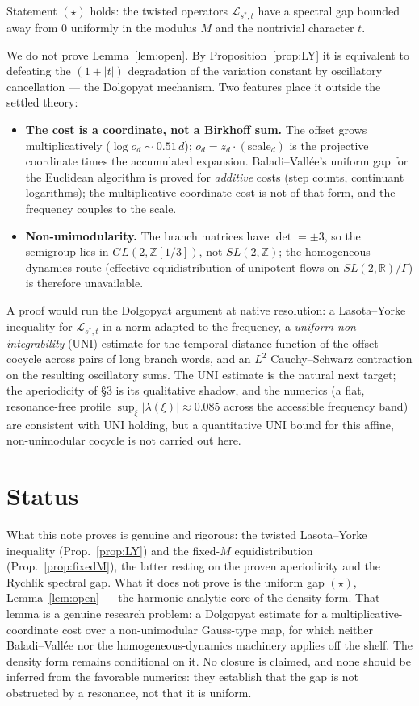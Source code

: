 \documentclass[11pt]{article}
\theoremstyle{definition}\newtheorem{definition}{Definition}
\theoremstyle{remark}\newtheorem{remark}{Remark}
\newcommand{\Z}{\mathbb{Z}}\newcommand{\Rr}{\mathbb{R}}\newcommand{\C}{\mathbb{C}}
\newcommand{\Lop}{\mathcal L}\newcommand{\var}{\operatorname{var}}\newcommand{\e}{\mathbf e}
\begin{document}
\begin{lemma}\label{lem:open}
Statement $(\star)$ holds: the twisted operators $\Lop_{s^\ast,t}$ have a
spectral gap bounded away from $0$ uniformly in the modulus $M$ and the
nontrivial character $t$.
\end{lemma}

We do not prove Lemma~\ref{lem:open}. By Proposition~\ref{prop:LY} it is
equivalent to defeating the $(1+|t|)$ degradation of the variation constant by
oscillatory cancellation --- the Dolgopyat mechanism. Two features place it
outside the settled theory:
\begin{itemize}[leftmargin=1.4em]
\item \textbf{The cost is a coordinate, not a Birkhoff sum.} The offset grows
multiplicatively ($\log o_d\sim 0.51\,d$); $o_d=z_d\cdot(\text{scale}_d)$ is
the projective coordinate times the accumulated expansion. Baladi--Vall\'ee's
uniform gap for the Euclidean algorithm is proved for \emph{additive} costs
(step counts, continuant logarithms); the multiplicative-coordinate cost is
not of that form, and the frequency couples to the scale.
\item \textbf{Non-unimodularity.} The branch matrices have $\det=\pm3$, so the
semigroup lies in $GL(2,\Z[1/3])$, not $SL(2,\Z)$; the homogeneous-dynamics
route (effective equidistribution of unipotent flows on $SL(2,\Rr)/\Gamma$) is
therefore unavailable.
\end{itemize}
A proof would run the Dolgopyat argument at native resolution: a Lasota--Yorke
inequality for $\Lop_{s^\ast,t}$ in a norm adapted to the frequency, a
\emph{uniform non-integrability} (UNI) estimate for the temporal-distance
function of the offset cocycle across pairs of long branch words, and an
$L^2$ Cauchy--Schwarz contraction on the resulting oscillatory sums. The UNI
estimate is the natural next target; the aperiodicity of \S3 is its
qualitative shadow, and the numerics (a flat, resonance-free profile
$\sup_{\xi}|\lambda(\xi)|\approx0.085$ across the accessible frequency band)
are consistent with UNI holding, but a quantitative UNI bound for this affine,
non-unimodular cocycle is not carried out here.

\section{Status}
What this note proves is genuine and rigorous: the twisted Lasota--Yorke
inequality (Prop.~\ref{prop:LY}) and the fixed-$M$ equidistribution
(Prop.~\ref{prop:fixedM}), the latter resting on the proven aperiodicity and
the Rychlik spectral gap. What it does not prove is the uniform gap $(\star)$,
Lemma~\ref{lem:open} --- the harmonic-analytic core of the density form. That
lemma is a genuine research problem: a Dolgopyat estimate for a
multiplicative-coordinate cost over a non-unimodular Gauss-type map, for which
neither Baladi--Vall\'ee nor the homogeneous-dynamics machinery applies
off the shelf. The density form remains conditional on it. No closure is
claimed, and none should be inferred from the favorable numerics: they establish
that the gap is not obstructed by a resonance, not that it is uniform.
\end{document}
